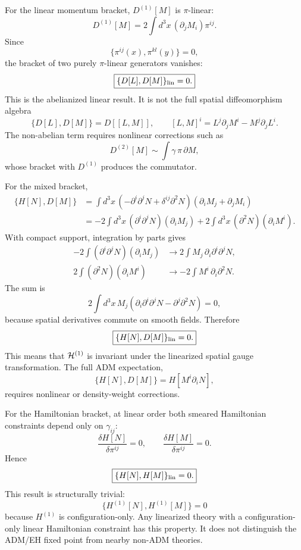 \documentclass[11pt]{article}
\begin{document}
For the linear momentum bracket, \(D^{(1)}[M]\) is \(\pi\)-linear:
\[
\boxed{D^{(1)}[M]=2\int d^3x\,(\partial_jM_i)\pi^{ij}.}
\]
Since
\[
\boxed{\{\pi^{ij}(x),\pi^{kl}(y)\}=0,}
\]
the bracket of two purely \(\pi\)-linear generators vanishes:
\[
\boxed{\{D[L],D[M]\}_{\rm lin}=0.}
\]
This is the abelianized linear result.  It is not the full spatial
diffeomorphism algebra
\[
\boxed{\{D[L],D[M]\}=D[[L,M]],\qquad
[L,M]^i=L^j\partial_jM^i-M^j\partial_jL^i.}
\]
The non-abelian term requires nonlinear corrections such as
\[
\boxed{D^{(2)}[M]\sim\int \gamma\,\pi\,\partial M,}
\]
whose bracket with \(D^{(1)}\) produces the commutator.

For the mixed bracket,
\[
\begin{aligned}
\{H[N],D[M]\}
&=\int d^3x\,
(-\partial^i\partial^jN+\delta^{ij}\partial^2N)
(\partial_iM_j+\partial_jM_i)\\
&=-2\int d^3x\,(\partial^i\partial^jN)(\partial_iM_j)
+2\int d^3x\,(\partial^2N)(\partial_iM^i).
\end{aligned}
\]
With compact support, integration by parts gives
\[
\boxed{
\begin{aligned}
-2\int(\partial^i\partial^jN)(\partial_iM_j)
&\to
2\int M_j\,\partial_i\partial^i\partial^jN,\\
2\int(\partial^2N)(\partial_iM^i)
&\to
-2\int M^i\,\partial_i\partial^2N.
\end{aligned}}
\]
The sum is
\[
\boxed{
2\int d^3x\,M_j
\left(\partial_i\partial^i\partial^jN-\partial^j\partial^2N\right)=0,
}
\]
because spatial derivatives commute on smooth fields.  Therefore
\[
\boxed{\{H[N],D[M]\}_{\rm lin}=0.}
\]
This means that \({\cal H}^{(1)}\) is invariant under the linearized spatial
gauge transformation.  The full ADM expectation,
\[
\boxed{\{H[N],D[M]\}=H[M^i\partial_iN],}
\]
requires nonlinear or density-weight corrections.

For the Hamiltonian bracket, at linear order both smeared Hamiltonian
constraints depend only on \(\gamma_{ij}\):
\[
\boxed{\frac{\delta H[N]}{\delta\pi^{ij}}=0,\qquad
\frac{\delta H[M]}{\delta\pi^{ij}}=0.}
\]
Hence
\[
\boxed{\{H[N],H[M]\}_{\rm lin}=0.}
\]
This result is structurally trivial:
\[
\boxed{\{H^{(1)}[N],H^{(1)}[M]\}=0}
\]
because \(H^{(1)}\) is configuration-only.  Any linearized theory with a
configuration-only linear Hamiltonian constraint has this property.  It does
not distinguish the ADM/EH fixed point from nearby non-ADM theories.
\end{document}
